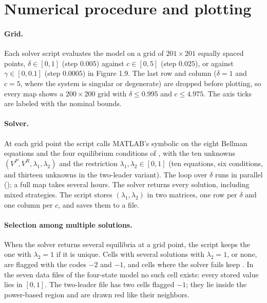 \section{Numerical procedure and plotting}
\label{sec:procedure}

\paragraph*{Grid.}
Each solver script evaluates the model on a grid of $201 \times 201$ equally
spaced points, $\delta \in [0, 1]$ (step $0.005$) against $c \in [0, 5]$
(step $0.025$), or against $\gamma \in [0, 0.1]$ (step $0.0005$) in Figure
1.9. The last row and column ($\delta = 1$ and $c = 5$, where the system is
singular or degenerate) are dropped before plotting, so every map shows a
$200 \times 200$ grid with $\delta \leq 0.995$ and $c \leq 4.975$. The axis
ticks are labeled with the nominal bounds.

\paragraph*{Solver.}
At each grid point the script calls MATLAB's symbolic  on the
eight Bellman equations and the four equilibrium conditions of
, with the ten unknowns $(V^P, V^R, \lambda_1, \lambda_2)$
and the restriction $\lambda_1, \lambda_2 \in [0, 1]$ (ten equations, six
conditions, and thirteen unknowns in the two-leader variant). The loop over
$\delta$ runs in parallel (); a full map takes several hours.
The solver returns every solution, including mixed strategies. The script
stores $(\lambda_1, \lambda_2)$ in two matrices, one row per $\delta$ and one
column per $c$, and saves them to a  file.

\paragraph*{Selection among multiple solutions.}
When the solver returns several equilibria at a grid point, the script keeps
the one with $\lambda_2 = 1$ if it is unique. Cells with several solutions
with $\lambda_2 = 1$, or none, are flagged with the codes $-2$ and $-1$, and
cells where the solver fails keep . In the seven
data files of the four-state model no such cell exists: every stored value
lies in $[0, 1]$. The two-leader file has two cells flagged $-1$; they lie
inside the power-based region and are drawn red like their neighbors.

